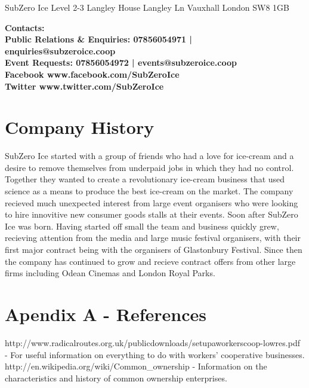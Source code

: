 \documentclass{article}
\begin{document}
SubZero Ice
Level 2-3 
Langley House
Langley Ln
Vauxhall
London
SW8 1GB

\bf{Contacts:} \\

Public Relations \& Enquiries: 07856054971 | enquiries@subzeroice.coop \\

Event Requests: 07856054972 | events@subzeroice.coop \\

Facebook www.facebook.com/SubZeroIce \\
Twitter www.twitter.com/SubZeroIce


\section{Company History}

SubZero Ice started with a group of friends who had a love for ice-cream and a desire to remove themselves from underpaid jobs in which they had no control. Together they wanted to create a revolutionary ice-cream business that used science as a means to produce the best ice-cream on the market. The company recieved much unexpected interest from large event organisers who were looking to hire innovitive new consumer goods stalls at their events. Soon after SubZero Ice was born. Having started off small the team and business quickly grew, recieving attention from the media and large music festival organisers, with their first major contract being with the organisers of Glastonbury Festival. Since then the company has continued to grow and recieve contract offers from other large firms including Odean Cinemas and London Royal Parks.

\section{Apendix A - References}

http://www.radicalroutes.org.uk/publicdownloads/setupaworkerscoop-lowres.pdf - For useful information on everything to do with workers' cooperative businesses.
http://en.wikipedia.org/wiki/Common_ownership - Information on the characteristics and history of common ownership enterprises.
\end{document}

